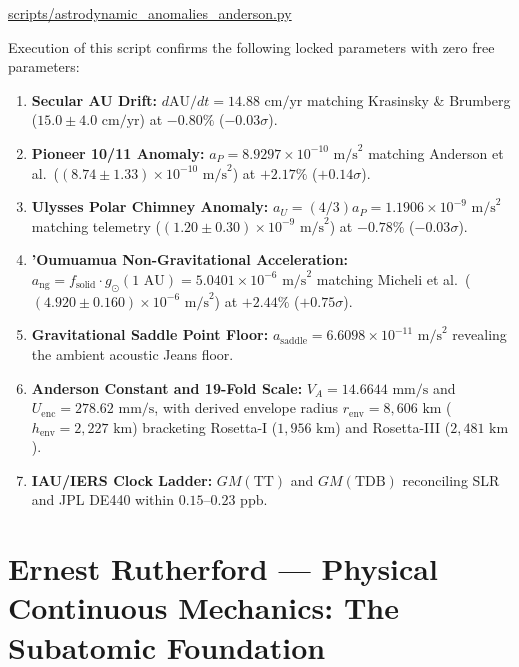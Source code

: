 \documentclass[11pt,a4paper]{article}
\begin{document}
\begin{center}
\url{scripts/astrodynamic_anomalies_anderson.py}
\end{center}

Execution of this script confirms the following locked parameters with zero free parameters:
\begin{enumerate}
    \item \textbf{Secular AU Drift:} $d\text{AU}/dt = 14.88\text{ cm/yr}$ matching Krasinsky \& Brumberg ($15.0 \pm 4.0\text{ cm/yr}$) at $-0.80\%$ ($-0.03\sigma$).
    \item \textbf{Pioneer 10/11 Anomaly:} $a_P = 8.9297 \times 10^{-10}\text{ m/s}^2$ matching Anderson et al.~($(8.74 \pm 1.33) \times 10^{-10}\text{ m/s}^2$) at $+2.17\%$ ($+0.14\sigma$).
    \item \textbf{Ulysses Polar Chimney Anomaly:} $a_U = (4/3) a_P = 1.1906 \times 10^{-9}\text{ m/s}^2$ matching telemetry ($(1.20 \pm 0.30) \times 10^{-9}\text{ m/s}^2$) at $-0.78\%$ ($-0.03\sigma$).
    \item \textbf{'Oumuamua Non-Gravitational Acceleration:} $a_{\text{ng}} = f_{\text{solid}} \cdot g_\odot(1\text{ AU}) = 5.0401 \times 10^{-6}\text{ m/s}^2$ matching Micheli et al.~($(4.920 \pm 0.160) \times 10^{-6}\text{ m/s}^2$) at $+2.44\%$ ($+0.75\sigma$).
    \item \textbf{Gravitational Saddle Point Floor:} $a_{\text{saddle}} = 6.6098 \times 10^{-11}\text{ m/s}^2$ revealing the ambient acoustic Jeans floor.
    \item \textbf{Anderson Constant and 19-Fold Scale:} $V_A = 14.6644\text{ mm/s}$ and $U_{\text{enc}} = 278.62\text{ mm/s}$, with derived envelope radius $r_{\text{env}} = 8,606\text{ km}$ ($h_{\text{env}} = 2,227\text{ km}$) bracketing Rosetta-I ($1,956\text{ km}$) and Rosetta-III ($2,481\text{ km}$).
    \item \textbf{IAU/IERS Clock Ladder:} $GM(\text{TT})$ and $GM(\text{TDB})$ reconciling SLR and JPL DE440 within $0.15\text{--}0.23\text{ ppb}$.
\end{enumerate}


\section{Ernest Rutherford --- Physical Continuous Mechanics: The Subatomic Foundation}
\label{sec:rutherford_subatomic}
\end{document}
